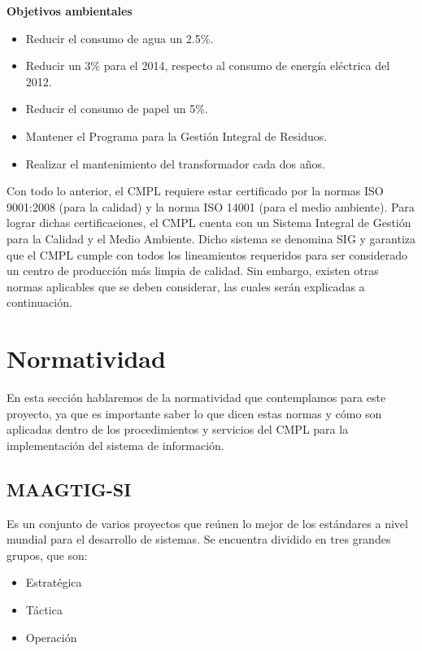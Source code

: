\textbf{Objetivos ambientales}

\begin{itemize}
	\item Reducir el consumo de agua un 2.5\%.
	\item Reducir un 3\% para el 2014, respecto al consumo de energía eléctrica del 2012.
	\item Reducir el consumo de papel un 5\%.
	\item Mantener el Programa para la Gestión Integral de Residuos.
	\item Realizar el mantenimiento del transformador cada dos años.
\end{itemize}

	Con todo lo anterior, el CMPL requiere estar certificado por la normas ISO 9001:2008 (para la calidad) y la norma ISO 14001 (para el medio ambiente). Para lograr dichas certificaciones, el CMPL cuenta con un Sistema Integral de Gestión para la Calidad y el Medio Ambiente. Dicho sistema se denomina SIG y garantiza que el CMPL cumple con todos los lineamientos requeridos para ser considerado un centro de producción más limpia de calidad. Sin embargo, existen otras normas aplicables que se deben considerar, las cuales serán explicadas a continuación.
	
\section{Normatividad}
	En esta sección hablaremos de la normatividad que contemplamos para este proyecto, ya que es importante saber lo que dicen estas normas y cómo son aplicadas dentro de los procedimientos y servicios del CMPL para la implementación del sistema de información.
	
	\subsection{MAAGTIG-SI}%
	Es un conjunto de varios proyectos que reúnen lo mejor de los estándares a nivel mundial para el desarrollo de sistemas. Se encuentra dividido en tres grandes grupos, que son:
	
	\begin{itemize}
		\item Estratégica
		\item Táctica
		\item Operación
	\end{itemize}
	
